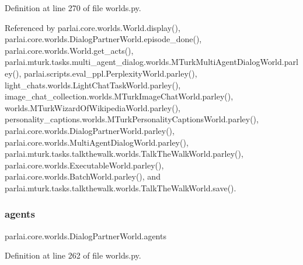 Definition at line 270 of file worlds.\+py.



Referenced by parlai.\+core.\+worlds.\+World.\+display(), parlai.\+core.\+worlds.\+Dialog\+Partner\+World.\+episode\+\_\+done(), parlai.\+core.\+worlds.\+World.\+get\+\_\+acts(), parlai.\+mturk.\+tasks.\+multi\+\_\+agent\+\_\+dialog.\+worlds.\+M\+Turk\+Multi\+Agent\+Dialog\+World.\+parley(), parlai.\+scripts.\+eval\+\_\+ppl.\+Perplexity\+World.\+parley(), light\+\_\+chats.\+worlds.\+Light\+Chat\+Task\+World.\+parley(), image\+\_\+chat\+\_\+collection.\+worlds.\+M\+Turk\+Image\+Chat\+World.\+parley(), worlds.\+M\+Turk\+Wizard\+Of\+Wikipedia\+World.\+parley(), personality\+\_\+captions.\+worlds.\+M\+Turk\+Personality\+Captions\+World.\+parley(), parlai.\+core.\+worlds.\+Dialog\+Partner\+World.\+parley(), parlai.\+core.\+worlds.\+Multi\+Agent\+Dialog\+World.\+parley(), parlai.\+mturk.\+tasks.\+talkthewalk.\+worlds.\+Talk\+The\+Walk\+World.\+parley(), parlai.\+core.\+worlds.\+Executable\+World.\+parley(), parlai.\+core.\+worlds.\+Batch\+World.\+parley(), and parlai.\+mturk.\+tasks.\+talkthewalk.\+worlds.\+Talk\+The\+Walk\+World.\+save().

\mbox{\label{classparlai_1_1core_1_1worlds_1_1DialogPartnerWorld_a04185d1d55ca86c96c796f12f2226fc9}} 
\subsubsection{\texorpdfstring{agents}{agents}}
{\footnotesize\ttfamily parlai.\+core.\+worlds.\+Dialog\+Partner\+World.\+agents}



Definition at line 262 of file worlds.\+py.



